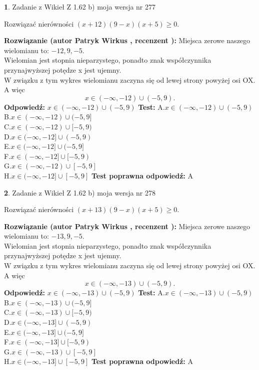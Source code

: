 \documentclass[12pt, a4paper]{article}
\theoremstyle{definition} %
\newtheorem{zad}{}
\newcommand{\zadStart}[1]{\begin{zad}#1\newline}
\newcommand{\zadStop}{\end{zad}}
\newcommand{\rozwStart}[2]{\noindent \textbf{Rozwiązanie (autor #1 , recenzent #2): }\newline}
\newcommand{\rozwStop}{\newline}
\newcommand{\odpStart}{\noindent \textbf{Odpowiedź:}\newline}
\newcommand{\odpStop}{\newline}
\newcommand{\testStart}{\noindent \textbf{Test:}\newline}
\newcommand{\testStop}{\newline}
\newcommand{\kluczStart}{\noindent \textbf{Test poprawna odpowiedź:}\newline}
\newcommand{\kluczStop}{\newline}
\begin{document}
\zadStart{Zadanie z Wikieł Z 1.62 b) moja wersja nr 277}

Rozwiązać nierówności $(x+12)(9-x)(x+5)\ge0$.
\zadStop
\rozwStart{Patryk Wirkus}{}
Miejsca zerowe naszego wielomianu to: $-12, 9, -5$.\\
Wielomian jest stopnia nieparzystego, ponadto znak współczynnika przy\linebreak najwyższej potędze x jest ujemny.\\ W związku z tym wykres wielomianu zaczyna się od lewej strony powyżej osi OX. A więc $$x \in (-\infty,-12) \cup (-5,9).$$
\rozwStop
\odpStart
$x \in (-\infty,-12) \cup (-5,9)$
\odpStop
\testStart
A.$x \in (-\infty,-12) \cup (-5,9)$\\
B.$x \in (-\infty,-12) \cup (-5,9]$\\
C.$x \in (-\infty,-12) \cup [-5,9)$\\
D.$x \in (-\infty,-12] \cup (-5,9)$\\
E.$x \in (-\infty,-12] \cup (-5,9]$\\
F.$x \in (-\infty,-12] \cup [-5,9)$\\
G.$x \in (-\infty,-12) \cup [-5,9]$\\
H.$x \in (-\infty,-12] \cup [-5,9]$
\testStop
\kluczStart
A
\kluczStop



\zadStart{Zadanie z Wikieł Z 1.62 b) moja wersja nr 278}

Rozwiązać nierówności $(x+13)(9-x)(x+5)\ge0$.
\zadStop
\rozwStart{Patryk Wirkus}{}
Miejsca zerowe naszego wielomianu to: $-13, 9, -5$.\\
Wielomian jest stopnia nieparzystego, ponadto znak współczynnika przy\linebreak najwyższej potędze x jest ujemny.\\ W związku z tym wykres wielomianu zaczyna się od lewej strony powyżej osi OX. A więc $$x \in (-\infty,-13) \cup (-5,9).$$
\rozwStop
\odpStart
$x \in (-\infty,-13) \cup (-5,9)$
\odpStop
\testStart
A.$x \in (-\infty,-13) \cup (-5,9)$\\
B.$x \in (-\infty,-13) \cup (-5,9]$\\
C.$x \in (-\infty,-13) \cup [-5,9)$\\
D.$x \in (-\infty,-13] \cup (-5,9)$\\
E.$x \in (-\infty,-13] \cup (-5,9]$\\
F.$x \in (-\infty,-13] \cup [-5,9)$\\
G.$x \in (-\infty,-13) \cup [-5,9]$\\
H.$x \in (-\infty,-13] \cup [-5,9]$
\testStop
\kluczStart
A
\kluczStop
\end{document}
